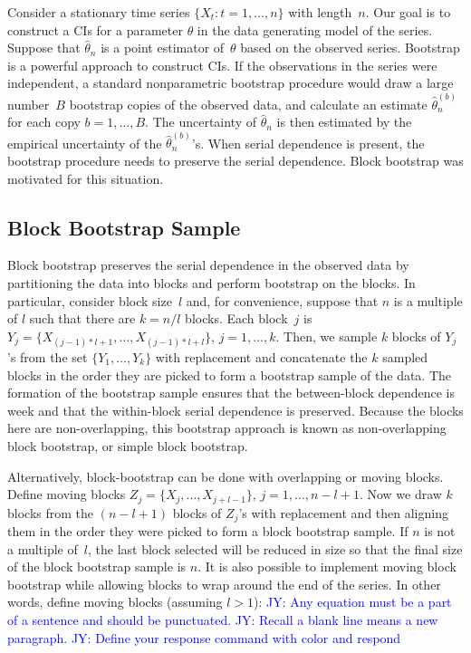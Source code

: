\documentclass[12pt, letterpaper, titlepage]{article}
\newcommand{\jy}[1]{\textcolor{blue}{JY: #1}}
\begin{document}
Consider a stationary time series $\{X_t: t = 1, \ldots, n\}$ with length~$n$.
Our goal is to construct a CIs for a parameter $\theta$ in the
data generating model of the series. Suppose that $\hat\theta_n$ is a point
estimator of~$\theta$ based on the observed series. Bootstrap is a powerful
approach to construct CIs. If the observations in the series
were independent, a standard nonparametric bootstrap procedure would draw a
large number~$B$ bootstrap copies of the observed data, and calculate an
estimate $\hat\theta_n^{(b)}$ for each copy $b = 1, \ldots, B$. The uncertainty
of $\hat\theta_n$ is then estimated by the empirical uncertainty of the
$\hat\theta_n^{(b)}$'s. When serial dependence is present, the bootstrap
procedure needs to preserve the serial dependence. Block bootstrap was
motivated for this situation. 


\subsection{Block Bootstrap Sample}

Block bootstrap preserves the serial dependence in the observed data by
partitioning the data into blocks and perform bootstrap on the blocks.
In particular, consider block size~$l$ and, for convenience, suppose that
$n$ is a multiple of $l$ such that there are $k = n / l$ blocks. Each block~$j$
is $Y_j = \{X_{(j - 1) * l + 1}, \ldots, X_{(j - 1) * l + l}\}$,
$j = 1, \ldots,   k$.  Then, we sample $k$ blocks of $Y_j$'s from the set 
$\{Y_1, \ldots, Y_k\}$ with replacement and concatenate the $k$ sampled blocks
in the order they are picked to form a bootstrap sample of the data. The
formation of the bootstrap sample ensures that the between-block dependence is
week and that the within-block serial dependence is preserved. Because the
blocks here are non-overlapping, this bootstrap approach is known as
non-overlapping block bootstrap, or simple block bootstrap.


Alternatively, block-bootstrap can be done with overlapping or moving blocks.
Define moving blocks $Z_j = \{X_j, \ldots, X_{j + l - 1}\}$,
$j = 1, \ldots, n - l + 1$. Now we draw $k$ blocks from the $(n - l + 1)$
blocks
of $Z_j$'s with replacement and then aligning them in the order they were
picked
to form a block bootstrap sample. If $n$ is not a multiple of~$l$, the last
block selected will be reduced in size so that the final size of the
block bootstrap sample is $n$. It is also possible to implement moving block
bootstrap while allowing blocks to wrap around the end of the series. In other
words, define moving blocks (assuming $l > 1$):
\jy{Any equation must be a part of a sentence and should be punctuated.}
\jy{Recall a blank line means a new paragraph.}
\jy{Define your response command with color and respond}
\end{document}
